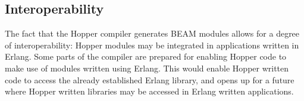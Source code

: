 
\subsection{Interoperability}


The fact that the Hopper compiler generates BEAM modules allows for a degree of interoperability: Hopper modules may be integrated in applications written in Erlang. Some parts of the compiler are prepared for enabling Hopper code to make use of modules written using Erlang. This would enable Hopper written code to access the already established Erlang library, and opens up for a future where Hopper written libraries may be accessed in Erlang written applications.